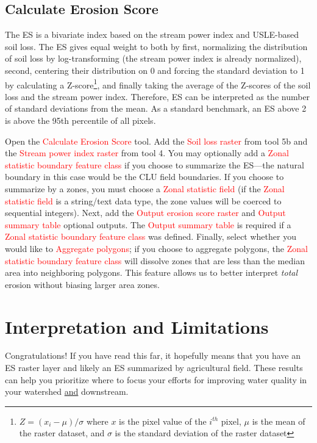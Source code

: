 \documentclass{article}
\newcommand{\toolPar}[1]{\textcolor{red}{#1}}
\begin{document}
	\subsection{Calculate Erosion Score}
		The ES is a bivariate index based on the stream power index and USLE-based soil loss. The ES gives equal weight to both by first, normalizing the distribution of soil loss by log-transforming (the stream power index is already normalized), second, centering their distribution on 0 and forcing the standard deviation to 1 by calculating a Z-score\footnote{$Z = (x_{i} - \mu) / \sigma$ where $x$ is the pixel value of the $i^{th}$ pixel, $\mu$ is the mean of the raster dataset, and $\sigma$ is the standard deviation of the raster dataset}, and finally taking the average of the Z-scores of the soil loss and the stream power index. Therefore, ES can be interpreted as the number of standard deviations from the mean. As a standard benchmark, an ES above 2 is above the 95th percentile of all pixels.
		
		Open the \toolPar{Calculate Erosion Score} tool. Add the \toolPar{Soil loss raster} from tool 5b and the \toolPar{Stream power index raster} from tool 4. You may optionally add a \toolPar{Zonal statistic boundary feature class} if you choose to summarize the ES---the natural boundary in this case would be the CLU field boundaries. If you choose to summarize by a zones, you must choose a \toolPar{Zonal statistic field} (if the \toolPar{Zonal statistic field} is a string/text data type, the zone values will be coerced to sequential integers). Next, add the \toolPar{Output erosion score raster} and \toolPar{Output summary table} optional outputs. The \toolPar{Output summary table} is required if a \toolPar{Zonal statistic boundary feature class} was defined. Finally, select whether you would like to \toolPar{Aggregate polygons}; if you choose to aggregate polygons, the \toolPar{Zonal statistic boundary feature class} will dissolve zones that are less than the median area into neighboring polygons. This feature allows us to better interpret \emph{total} erosion without biasing larger area zones.
\section{Interpretation and Limitations}
	Congratulations! If you have read this far, it hopefully means that you have an ES raster layer and likely an ES summarized by agricultural field. These results can help you prioritize where to focus your efforts for improving water quality in your watershed \underline{and} downstream. 
	
\end{document}
